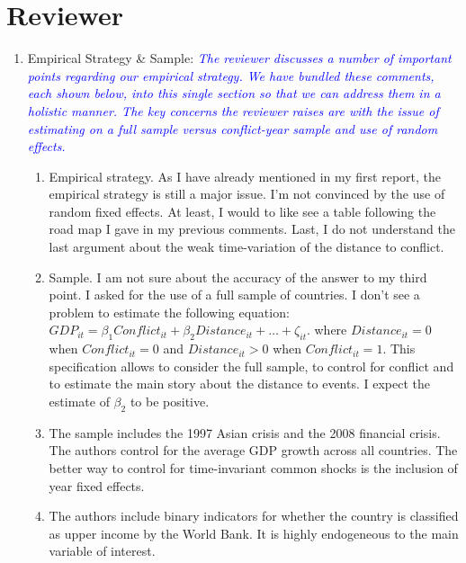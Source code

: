 \section*{Reviewer}

\begin{enumerate}
\item Empirical Strategy \& Sample: \textcolor{blue}{\emph{The reviewer discusses a number of important points regarding our empirical strategy. We have bundled these comments, each shown below, into this single section so that we can address them in a holistic manner. The key concerns the reviewer raises are with the issue of estimating on a full sample versus conflict-year sample and use of random effects.}} \\
\begin{enumerate}
	\item Empirical strategy. As I have already mentioned in my first report, the empirical strategy is still a major issue. I’m not convinced by the use of random fixed effects. At least, I would to like see a table following the road map I gave in my previous comments. Last, I do not understand the last argument about the weak time-variation of the distance to conflict. \\

	\item Sample. I am not sure about the accuracy of the answer to my third point. I asked for the use of a full sample of countries. I don’t see a problem to estimate the following equation: $GDP_{it} = \beta_{1}Conflict_{it} + \beta_{2}Distance_{it}+\ldots+\zeta_{it}$. where $Distance_{it}=0$ when $Conflict_{it}=0$ and $Distance_{it}>0$ when $Conflict_{it}=1$. This specification allows to consider the full sample, to control for conflict and to estimate the main story about the distance to events. I expect the estimate of $\beta_{2}$ to be positive. \\

	\item The sample includes the 1997 Asian crisis and the 2008 financial crisis. The authors control for the average GDP growth across all countries. The better way to control for time-invariant common shocks is the inclusion of year fixed effects. \\	

	\item The authors include binary indicators for whether the country is classified as upper income by the World Bank. It is highly endogeneous to the main variable of interest. \\	


\end{enumerate}
\end{enumerate}
